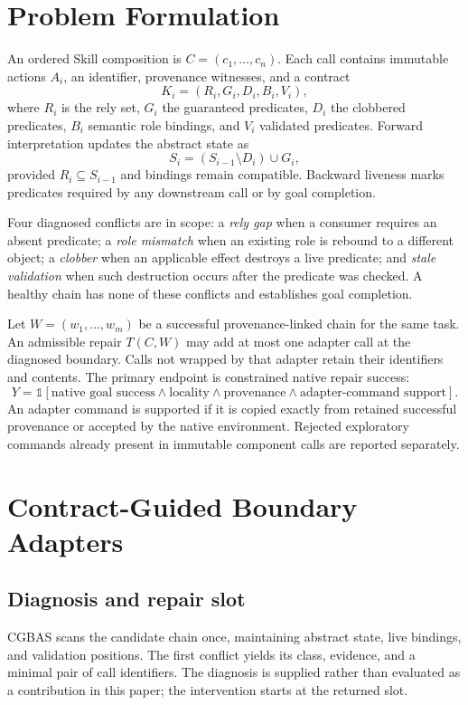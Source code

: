 \documentclass[10pt]{article}
\begin{document}
\section{Problem Formulation}

An ordered Skill composition is $C=(c_1,\ldots,c_n)$. Each call contains immutable
actions $A_i$, an identifier, provenance witnesses, and a contract
\begin{equation}
  K_i=(R_i,G_i,D_i,B_i,V_i),
\end{equation}
where $R_i$ is the rely set, $G_i$ the guaranteed predicates, $D_i$ the clobbered
predicates, $B_i$ semantic role bindings, and $V_i$ validated predicates. Forward
interpretation updates the abstract state as
\begin{equation}
  S_i=(S_{i-1}\setminus D_i)\cup G_i,
\end{equation}
provided $R_i\subseteq S_{i-1}$ and bindings remain compatible. Backward liveness
marks predicates required by any downstream call or by goal completion.

Four diagnosed conflicts are in scope: a \emph{rely gap} when a consumer requires
an absent predicate; a \emph{role mismatch} when an existing role is rebound to a
different object; a \emph{clobber} when an applicable effect destroys a live
predicate; and \emph{stale validation} when such destruction occurs after the
predicate was checked. A healthy chain has none of these conflicts and establishes
goal completion.

Let $W=(w_1,\ldots,w_m)$ be a successful provenance-linked chain for the same
task. An admissible repair $T(C,W)$ may add at most one adapter call at the
diagnosed boundary. Calls not wrapped by that adapter retain their identifiers
and contents. The primary endpoint is constrained native repair success:
\begin{equation}
Y=\mathbb{1}[\text{native goal success}\land\text{locality}\land
\text{provenance}\land\text{adapter-command support}].
\end{equation}
An adapter command is supported if it is copied exactly from retained successful
provenance or accepted by the native environment. Rejected exploratory commands
already present in immutable component calls are reported separately.

\section{Contract-Guided Boundary Adapters}

\subsection{Diagnosis and repair slot}
CGBAS scans the candidate chain once, maintaining abstract state, live bindings,
and validation positions. The first conflict yields its class, evidence, and a
minimal pair of call identifiers. The diagnosis is supplied rather than evaluated
as a contribution in this paper; the intervention starts at the returned slot.
\end{document}
